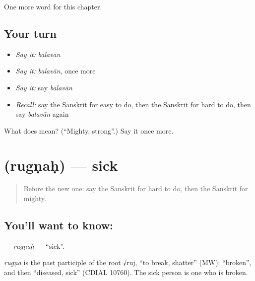 \begin{grammarlens}[title={What you've built}]
One more word for this chapter.
\end{grammarlens}

\subsection*{Your turn}
\begin{itemize}
\raggedright
  \item \emph{Say it:} \emph{balavān}
  \item \emph{Say it:} \emph{balavān}, once more
  \item \emph{Say it:} say \emph{balavān}
  \item \emph{Recall:} say the Sanskrit for easy to do, then the Sanskrit for hard to do, then say \emph{balavān} again
\end{itemize}

\begin{tcolorbox}[breakable,colback=teal!4,colframe=teal!35!black,title={Before you move on}]
What does  mean? (\textquotedblleft{}Mighty, strong\textquotedblright{}.) Say it once more.
\end{tcolorbox}
\section[\texorpdfstring{\sk{रुग्णः} (rugṇaḥ)}{रुग्णः (rugṇaḥ)}]{ (rugṇaḥ) — sick}

\label{lesson:SA-C243-rugnah}



\begin{quote}
Before the new one: say the Sanskrit for hard to do, then the Sanskrit for mighty.
\end{quote}

\subsection*{You'll want to know: }
\textbf{} — \emph{rugṇaḥ} — \textquotedblleft{}sick\textquotedblright{}.

\begin{cousinweb}
\emph{rugṇa} is the past participle of the root √ruj, \textquotedblleft{}to break, shatter\textquotedblright{} (MW): \textquotedblleft{}broken\textquotedblright{}, and then \textquotedblleft{}diseased, sick\textquotedblright{} (CDIAL 10760). The sick person is one who is broken.
\end{cousinweb}

